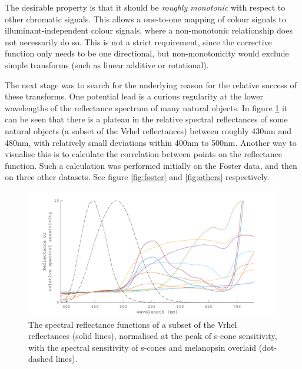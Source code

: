 The desirable property is that it should be \emph{roughly monotonic} with respect to other chromatic signals. This allows a one-to-one mapping of colour signals to illuminant-independent colour signals, where a non-monotonic relationship does not necessarily do so. This is not a strict requirement, since the corrective function only needs to be one directional, but non-monotonicity would exclude simple transforms (such as linear additive or rotational).

The next stage was to search for the underlying reason for the relative success of these transforms. One potential lead is a curious regularity at the lower wavelengths of the reflectance spectrum of many natural objects. In figure \ref{fig:plateau} it can be seen that there is a plateau in the relative spectral reflectances of some natural objects (a subset of the Vrhel reflectances) between roughly 430nm and 480nm, with relatively small deviations within 400nm to 500nm. Another way to visualise this is to calculate the correlation between points on the reflectance function. Such a calculation was performed initially on the Foster data, and then on three other datasets. See figure \ref{fig:foster} and \ref{fig:others} respectively.

\begin{figure}[htbp]
 \includegraphics[max width=\textwidth]{figs/comp/melcomp_2_caller/plateau.pdf}
 \caption{The spectral reflectance functions of a subset of the Vrhel reflectances (solid lines), normalised at the peak of s-cone sensitivity, with the spectral sensitivity of s-cones and melanopsin overlaid (dot-dashed lines).}
 \label{fig:plateau}
\end{figure} 

